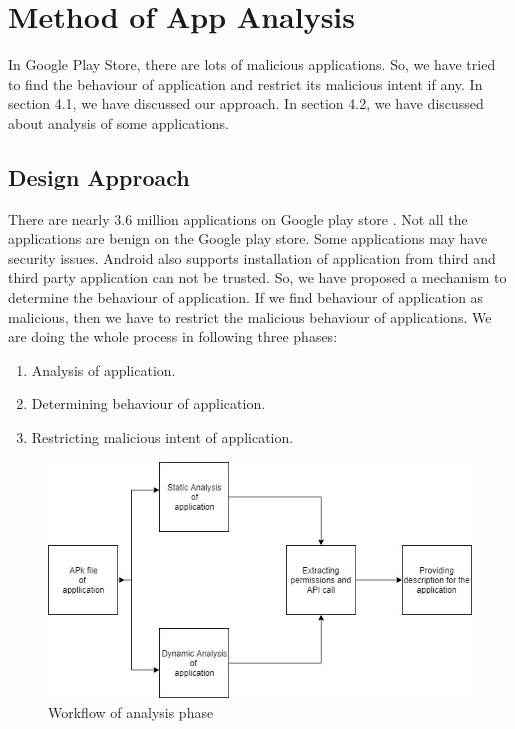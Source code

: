 \chapter{Method of App Analysis}
\label{ch:dl}

\thispagestyle{empty}
In Google Play Store, there are lots of malicious applications. So, we have tried to find the behaviour of application and restrict its malicious intent if any. In section 4.1, we have discussed our approach. In section 4.2, we have discussed about analysis of some applications.
\section{Design Approach}
There are nearly 3.6 million applications on Google play store \cite{availableapp}. Not all the applications are benign on the Google play store. Some applications may have security issues. Android also supports installation of application from third and third party application can not be trusted. So, we have proposed a mechanism to determine the behaviour of application. If we find behaviour of application as malicious, then we have to restrict the malicious behaviour of applications. We are doing the whole process in following three phases:
\begin{enumerate}
    \item Analysis of application.
    \item Determining behaviour of application.
    \item Restricting malicious intent of application.
\end{enumerate}
\begin{figure}[!h]
  \centering
  \includegraphics [scale=0.6] {archwork1.jpg}
  \caption{Workflow of analysis phase}
  \label{fig:archwork1}
\end{figure}


